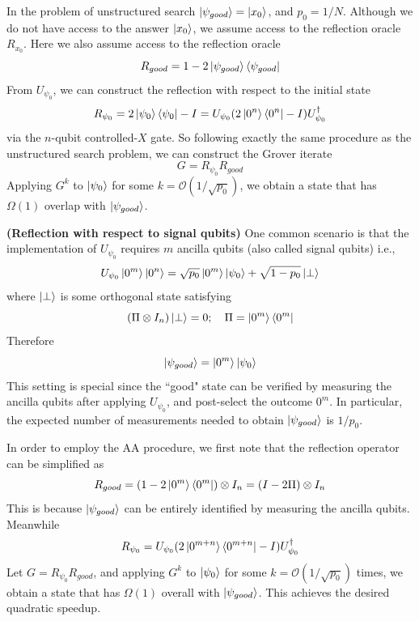 In the problem of unstructured search $\ket{\psi_{good}}=\ket{x_0}$, and $p_0=1/N$. Although we do not have access to the answer $\ket{x_0}$, we assume access to the reflection oracle $R_{x_0}$. Here we also assume access to the reflection oracle
\[
R_{good} = 1-2\ket{\psi_{good}}\bra{\psi_{good}}
\]
From $U_{\psi_0}$, we can construct the reflection with respect to the initial state
\[
R_{\psi_0}=2\ket{\psi_0}\bra{\psi_0} - I=U_{\psi_0}(2\ket{0^n}\bra{0^n}-I)U_{\psi_0}^{\dagger}
\]
via the $n$-qubit controlled-$X$ gate. So following exactly the same procedure as the unstructured search problem, we can construct the Grover iterate
\[
G=R_{\psi_0}R_{good}
\]
Applying $G^k$ to $\ket{\psi_0}$ for some $k=\mathcal{O}(1/\sqrt{p_0})$, we obtain a state that has $\Omega(1)$ overlap with $\ket{\psi_{good}}$.

\begin{example}
    \textbf{(Reflection with respect to signal qubits)} One common scenario is that the implementation of $U_{\psi_0}$ requires $m$ ancilla qubits (also called signal qubits) i.e.,
    \[
    U_{\psi_0}\ket{0^m}\ket{0^n} = \sqrt{p_0}\ket{0^m}\ket{\psi_0}+\sqrt{1-p_0}\ket{\perp}
    \]
    where $\ket{\perp}$ is some orthogonal state satisfying
    \[
    (\Pi \otimes I_n)\ket{\perp}=0; \quad \Pi=\ket{0^m}\bra{0^m}
    \]
    Therefore
    \[
    \ket{\psi_{good}}=\ket{0^m}\ket{\psi_0}
    \]
    This setting is special since the ``good" state can be verified by measuring the ancilla qubits after applying $U_{\psi_0}$, and post-select the outcome $0^m$. In particular, the expected number of measurements needed to obtain $\ket{\psi_{good}}$ is $1/p_0$.

    In order to employ the AA procedure, we first note that the reflection operator can be simplified as
    \[
    R_{good} = (1-2\ket{0^m}\bra{0^m})\otimes I_n = (I-2\Pi)\otimes I_n
    \]
    This is because $\ket{\psi_{good}}$ can be entirely identified by measuring the ancilla qubits. Meanwhile
    \[
    R_{\psi_0}= U_{\psi_0} (2\ket{0^{m+n}}\bra{0^{m+n}}-I)U_{\psi_0}^{\dagger}
    \]
    Let $G=R_{\psi_0}R_{good}$, and applying $G^k$ to $\ket{\psi_0}$ for some $k=\mathcal{O}(1/\sqrt{p_0})$ times, we obtain a state that has $\Omega(1)$ overall with $\ket{\psi_{good}}$. This achieves the desired quadratic speedup.
\end{example}

